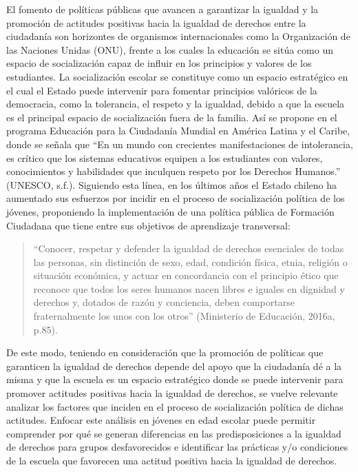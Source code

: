 \documentclass[12pt,twoside]{templates/facsothesis}
\begin{document}
El fomento de políticas públicas que avancen a garantizar la igualdad y la promoción de actitudes positivas hacia la igualdad de derechos entre la ciudadanía son horizontes de organismos internacionales como la Organización de las Naciones Unidas (ONU), frente a los cuales la educación se sitúa como un espacio de socialización capaz de influir en los principios y valores de los estudiantes. La socialización escolar se constituye como un espacio estratégico en el cual el Estado puede intervenir para fomentar principios valóricos de la democracia, como la tolerancia, el respeto y la igualdad, debido a que la escuela es el principal espacio de socialización fuera de la familia. Así se propone en el programa Educación para la Ciudadanía Mundial en América Latina y el Caribe, donde se señala que ``En un mundo con crecientes manifestaciones de intolerancia, es crítico que los sistemas educativos equipen a los estudiantes con valores, conocimientos y habilidades que inculquen respeto por los Derechos Humanos.'' (UNESCO, s.f.). Siguiendo esta línea, en los últimos años el Estado chileno ha aumentado sus esfuerzos por incidir en el proceso de socialización política de los jóvenes, proponiendo la implementación de una política pública de Formación Ciudadana que tiene entre sus objetivos de aprendizaje transversal:

\begin{quote}
``Conocer, respetar y defender la igualdad de derechos esenciales de todas las personas, sin distinción de sexo, edad, condición física, etnia, religión o situación económica, y actuar en concordancia con el principio ético que reconoce que todos los seres humanos nacen libres e iguales en dignidad y derechos y, dotados de razón y conciencia, deben comportarse fraternalmente los unos con los otros'' (Ministerio de Educación, 2016a, p.85).
\end{quote}

De este modo, teniendo en consideración que la promoción de políticas que garanticen la igualdad de derechos depende del apoyo que la ciudadanía dé a la misma y que la escuela es un espacio estratégico donde se puede intervenir para promover actitudes positivas hacia la igualdad de derechos, se vuelve relevante analizar los factores que inciden en el proceso de socialización política de dichas actitudes. Enfocar este análisis en jóvenes en edad escolar puede permitir comprender por qué se generan diferencias en las predisposiciones a la igualdad de derechos para grupos desfavorecidos e identificar las prácticas y/o condiciones de la escuela que favorecen una actitud positiva hacia la igualdad de derechos.
\end{document}
